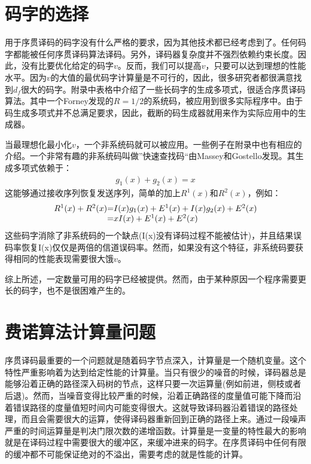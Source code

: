 \documentclass[twoside,numberorder]{buptthesis}
\begin{document}
\section{码字的选择}
用于序贯译码的码字没有什么严格的要求，因为其他技术都已经考虑到了。任何码字都能被任何序贯译码算法译码。另外，译码器复杂度并不强烈依赖约束长度。因此，没有比要优化给定的码字$v$。反而，我们可以提高$v$，只要可以达到理想的性能水平。因为$v$的大值的最优码字计算量是不可行的，因此，很多研究者都很满意找到$d_f$很大的码字。附录中表格中介绍了一些长码字的生成多项式，很适合序贯译码算法。其中一个Forney发现的$R=1/2$的系统码，被应用到很多实际程序中。由于码生成多项式并不总满足要求，因此，截断的码生成器就用来作为实际应用中的生成器。

当最理想化最小化$v$，一个非系统码就可以被应用。一些例子在附录中也有相应的介绍。一个非常有趣的非系统码叫做”快速查找码“由Massey和Gostello发现。其生成多项式依赖于：
\begin{eqnarray}
  g_1(x)+g_2(x)=x
  \label{equ:11}
\end{eqnarray}
这能够通过接收序列恢复发送序列，简单的加上$R^1(x)$和$R^2(x)$，例如：
\begin{eqnarray}
  \begin{array}{l@{=}l}
  R^1(x)+R^2(x)&I(x)g_1(x)+E^1(x)+I(x)g_2(x)+E^2(x)\\
  &xI(x)+E^1(x)+E^2(x)
\end{array}
  \label{equ:12}
\end{eqnarray}
这些码字消除了非系统码的一个缺点(I(x)没有译码过程不能被估计)，并且结果误码率恢复I(x)仅仅是两倍的信道误码率。然而，如果没有这个特征，非系统码要获得相同的性能表现需要很大饿$v$。

综上所述，一定数量可用的码字已经被提供。然而，由于某种原因一个程序需要更长的码字，也不是很困难产生的。
\section{费诺算法计算量问题}
序贯译码最重要的一个问题就是随着码字节点深入，计算量是一个随机变量。这个特性严重影响着为达到给定性能的计算量。当只有很少的噪音的时候，译码器总是能够沿着正确的路径深入码树的节点，这样只要一次运算量(例如前进，侧枝或者后退)。然而，当噪音变得比较严重的时候，沿着正确路径的度量值可能下降而沿着错误路径的度量值短时间内可能变得很大。这就导致译码器沿着错误的路径处理，而且会需要很大的运算，使得译码器重新回到正确的路径上来。通过一段噪声严重的时间运算量是判决门限次数的递增函数。计算量是一变量的特性最大的影响就是在译码过程中需要很大的缓冲区，来缓冲进来的码字。在序贯译码中任何有限的缓冲都不可能保证绝对的不溢出，需要考虑的就是性能的计算。
\end{document}
